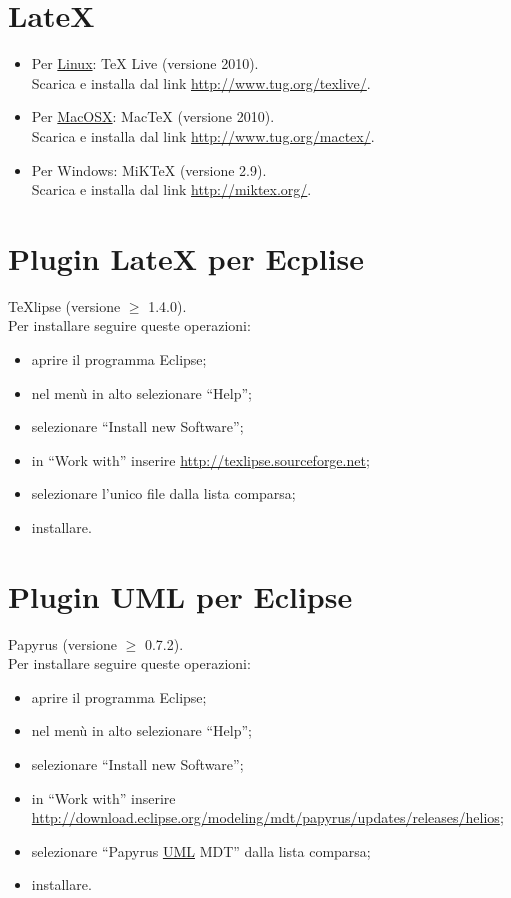 \section{LateX}
\begin{itemize}
\item {Per \underline{Linux}: TeX Live (versione 2010). 
\\
Scarica e installa dal link
\url{http://www.tug.org/texlive/}.}
\item {Per \underline{MacOSX}: MacTeX (versione 2010). 
\\
Scarica e installa dal link
\url{http://www.tug.org/mactex/}.}
\item {Per Windows: MiKTeX (versione 2.9). 
\\
Scarica e installa dal link
\url{http://miktex.org/}.}
\end{itemize}

\section{Plugin LateX per Ecplise}
TeXlipse (versione $\geq$ 1.4.0). 
\\
Per installare seguire queste
operazioni: 
\begin{itemize}
\item {aprire il programma Eclipse;} 
\item {nel men\`u in alto selezionare ``Help'';}
\item {selezionare ``Install new Software'';}
\item {in ``Work with'' inserire \url{http://texlipse.sourceforge.net};}
\item {selezionare l'unico file dalla lista comparsa;}
\item {installare.}
\end{itemize} 

\section{Plugin UML per Eclipse}
Papyrus (versione $\geq$ 0.7.2). 
\\
Per installare seguire queste
operazioni: 
\begin{itemize}
\item {aprire il programma Eclipse;} 
\item {nel men\`u in alto selezionare ``Help'';}
\item {selezionare ``Install new Software'';}
\item {in ``Work with'' inserire} \\
{\url{http://download.eclipse.org/modeling/mdt/papyrus/updates/releases/helios};}
\item {selezionare ``Papyrus \underline{UML} MDT'' dalla lista comparsa;}
\item {installare.}
\end{itemize} 

